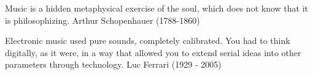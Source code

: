 	\begin{epigrafemid}
		{Music is a hidden metaphysical exercise of the soul, which does not know that it is philosophizing.} %
		{Arthur Schopenhauer (1788-1860)} %
	\end{epigrafemid}
	\vspace{-1cm}
	\begin{epigrafebot}
		{Electronic music used pure sounds, completely calibrated. You had to think digitally, as it were, in a way that allowed you to extend serial ideas into other parameters through technology.} %
		{Luc Ferrari (1929 - 2005)} %
	\end{epigrafebot}
\resumoeabstract %

\listadefiguras %

\listadetabelas %

